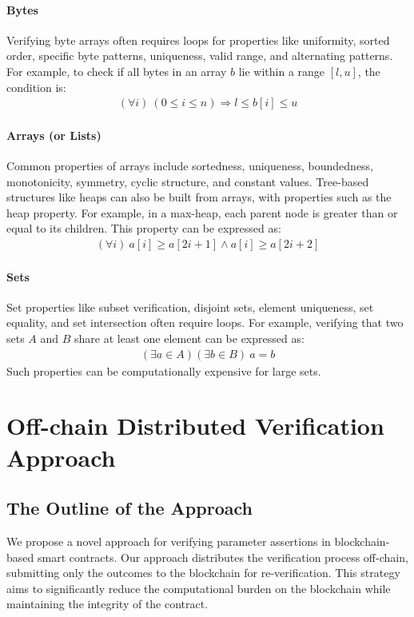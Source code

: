\documentclass[runningheads]{llncs}
\begin{document}
\paragraph{\textbf{Bytes}}
Verifying byte arrays often requires loops for properties like uniformity, sorted order, specific byte patterns, uniqueness, valid range, and alternating patterns. For example, to check if all bytes in an array \(b\) lie within a range \([l, u]\), the condition is:
\begin{gather*}
(\forall i) \ (0 \leq i \leq n) \Rightarrow l \leq b[i] \leq u
\end{gather*}
\paragraph{\textbf{Arrays (or Lists)}}
Common properties of arrays include sortedness, uniqueness, boundedness, monotonicity, symmetry, cyclic structure, and constant values. %
Tree-based structures like heaps can also be built from arrays, with properties such as the heap property. For example, in a max-heap, each parent node is greater than or equal to its children. This property can be expressed as:
\begin{gather*}
(\forall i) \ a[i] \geq a[2i+1] \land a[i] \geq a[2i+2]
\end{gather*}
\paragraph{\textbf{Sets}}
Set properties like subset verification, disjoint sets, element uniqueness, set equality, and set intersection often require loops. For example, verifying that two sets \(A\) and \(B\) share at least one element can be expressed as:
\begin{gather*}
(\exists a \in A) (\exists b \in B)\ a = b
\end{gather*}
Such properties can be computationally expensive for large sets.
\section{Off-chain Distributed Verification Approach}
\label{sec:offchain-distributed-verification-approach}
\subsection{The Outline of the Approach}
We propose a novel approach for verifying parameter assertions in blockchain-based smart contracts. Our approach distributes the verification process off-chain, submitting only the outcomes to the blockchain for re-verification. This strategy aims to significantly reduce the computational burden on the blockchain while maintaining the integrity of the contract.
\end{document}
